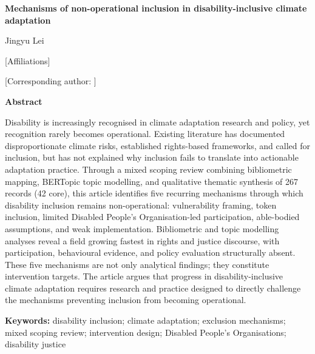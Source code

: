 \documentclass[12pt,a4paper]{article}
\date{}
\begin{document}

\begin{center}

{\large\bfseries
Mechanisms of non-operational inclusion in disability-inclusive climate adaptation\par}

\vspace{1.2em}

{\normalsize Jingyu Lei\par}

\vspace{0.5em}

{\small [Affiliations]\par}
{\small [Corresponding author: ]\par}

\end{center}

\vspace{1em}


\noindent\textbf{Abstract}

Disability is increasingly recognised in climate adaptation research and policy, yet recognition rarely becomes operational. Existing literature has documented disproportionate climate risks, established rights-based frameworks, and called for inclusion, but has not explained why inclusion fails to translate into actionable adaptation practice. Through a mixed scoping review combining bibliometric mapping, BERTopic topic modelling, and qualitative thematic synthesis of 267 records (42 core), this article identifies five recurring mechanisms through which disability inclusion remains non-operational: vulnerability framing, token inclusion, limited Disabled People's Organisation-led participation, able-bodied assumptions, and weak implementation. Bibliometric and topic modelling analyses reveal a field growing fastest in rights and justice discourse, with participation, behavioural evidence, and policy evaluation structurally absent. These five mechanisms are not only analytical findings; they constitute intervention targets. The article argues that progress in disability-inclusive climate adaptation requires research and practice designed to directly challenge the mechanisms preventing inclusion from becoming operational.

\vspace{1em}

\noindent\textbf{Keywords:} disability inclusion; climate adaptation; exclusion mechanisms; mixed scoping review; intervention design; Disabled People's Organisations; disability justice
\end{document}
